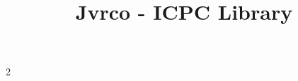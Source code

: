 \documentclass[10pt]{article}
\title{\vspace{-4ex}\Large{Jvrco - ICPC Library}}
\author{}
\date{}
\begin{document}
\begin{landscape}
\begin{multicols}{2}

\maketitle
\vspace{-13ex}
\tableofcontents
\pagestyle{fancy}



\end{multicols}
\end{landscape}
\end{document}
